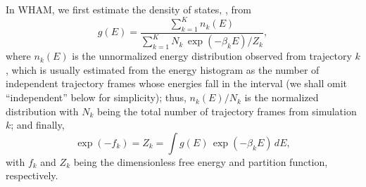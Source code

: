 \documentclass[aip,jcp,preprint,superscriptaddress]{revtex4-1}
\begin{document}
In WHAM,
we first estimate the density of states,
, from
%
\begin{equation}
g(E)
=
\frac{
  \sum_{k = 1}^K n_k(E)
}
{
  \sum_{k = 1}^K N_k \, \exp(-\beta_k E) / Z_k
},
\label{eq:gE_WHAM}
\end{equation}
%
where
$n_k(E)$
is
the unnormalized energy distribution
observed from trajectory $k$,
which
is usually estimated
from the energy histogram as
the number of independent trajectory frames
whose energies fall in the interval
(we shall omit ``independent'' below for simplicity);
%
{
thus, $n_k(E)/N_k$
is the normalized distribution
with $N_k$ being
the total number of trajectory frames
from simulation $k$;
}
%
and finally,
%
\begin{equation}
\exp( - f_k )
=
Z_k
=
\int g(E) \, \exp(-\beta_k E) \, dE,
\label{eq:Z}
\end{equation}
with
$f_k$
and
$Z_k$
being
the dimensionless free energy
and
partition function,
respectively.
\end{document}

